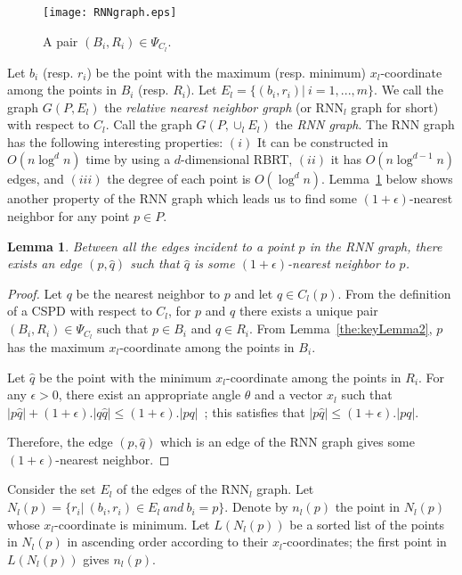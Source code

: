 \documentclass[preprint,12pt]{elsarticle}
\newtheorem{lemma}{Lemma}[section]
\begin{document}
\begin{figure}[h]
  \begin{center}
    \texttt{[image: RNNgraph.eps]}
  \end{center}
  \caption{A pair $(B_i,R_i)\in \Psi_{C_l}$.}
  \label{fig:RNNgraph}
\end{figure}

Let $b_i$ (resp. $r_i$) be the point with the maximum (resp. minimum) $x_l$-coordinate among the points in $B_i$ (resp. $R_i$). Let $E_l=\{(b_i,r_i)|~i=1,...,m\}$. We call the graph $G(P,E_l)$ the \textit{relative nearest neighbor graph} (or RNN$_l$ graph for short) with respect to $C_l$. Call the graph $G(P,\cup_l E_l)$ the \textit{RNN graph}.  The RNN graph has the following interesting properties: $(i)$ It can be constructed in $O(n\log^d n)$ time by using a $d$-dimensional RBRT, $(ii)$ it has $O(n\log^{d-1} n)$ edges, and $(iii)$ the degree of each point is $O(\log^d n)$. Lemma~\ref{the:RNNGlemma} below shows another property of the RNN graph which leads us to find some $(1+\epsilon)$-nearest neighbor for any point $p\in P$. 

\begin{lemma}\label{the:RNNGlemma}
Between all the edges incident to a point $p$ in the RNN graph, there exists an edge $(p,\hat{q})$ such that $\hat{q}$ is some $(1+\epsilon)$-nearest neighbor to $p$.
\end{lemma}
\begin{proof}
Let $q$ be the nearest neighbor to $p$ and let $q\in C_l(p)$. From the definition of a CSPD with respect to $C_l$, for $p$ and $q$ there exists a unique pair $(B_i,R_i)\in \Psi_{C_l}$ such that $p\in B_i$ and $q\in R_i$. From Lemma~\ref{the:keyLemma2}, $p$ has the maximum $x_l$-coordinate among the points in $B_i$. 

Let $\hat{q}$ be the point with the minimum $x_l$-coordinate among the points in $R_i$. For any $\epsilon>0$, there exist an appropriate angle $\theta$ and a vector $x_l$ such that $|p\hat{q}|+(1+\epsilon).|q\hat{q}|\leq (1+\epsilon).|pq|$~\cite{Abam:2011:KSX:1971362.1971367}; this satisfies that $|p\hat{q}|\leq (1+\epsilon).|pq|$. 

Therefore, the edge $(p,\hat{q})$ which is an edge of the RNN graph gives some $(1+\epsilon)$-nearest neighbor.
\end{proof}


Consider the set $E_l$ of the edges of the RNN$_l$ graph. Let $N_l(p)=\{r_i|~(b_i,r_i)\in E_l~and~b_i=p\}$. Denote by $n_l(p)$ the point in $N_l(p)$ whose $x_l$-coordinate is minimum. Let $L(N_l(p))$ be a sorted list of the points in $N_l(p)$ in ascending order according to their $x_l$-coordinates; the first point in $L(N_l(p))$ gives $n_l(p)$. 
\end{document}
